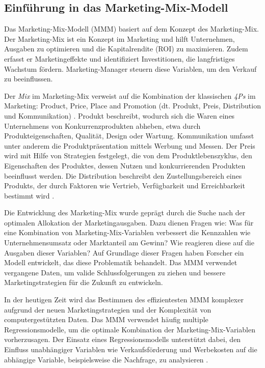 \subsection{Einführung in das Marketing-Mix-Modell}
\label{EinführungInDasMMM}
Das Marketing-Mix-Modell (\ac{MMM}) basiert auf dem Konzept des Marketing-Mix. Der Marketing-Mix ist ein Konzept im Marketing und hilft Unternehmen, Ausgaben zu optimieren und die Kapitalrendite (\ac{ROI}) zu maximieren. Zudem erfasst er Marketingeffekte und identifiziert Investitionen, die langfristiges Wachstum fördern. Marketing-Manager steuern diese Variablen, um den Verkauf zu beeinflussen. \par
Der \textit{Mix} im Marketing-Mix verweist auf die Kombination der klassischen \textit{4Ps} im Marketing: Product, Price, Place and Promotion (dt. Produkt, Preis, Distribution und Kommunikation) \cite[S. 110]{akinkunmi2018data}. Produkt beschreibt, wodurch sich die Waren eines Unternehmens von Konkurrenzprodukten abheben, etwa durch Produkteigenschaften, Qualität, Design oder Wartung. Kommunikation umfasst unter anderem die Produktpräsentation mittels Werbung und Messen. Der Preis wird mit Hilfe von Strategien festgelegt, die von dem Produktlebenszyklus, den Eigenschaften des Produktes, dessen Nutzen und  konkurrierenden Produkten beeinflusst werden. Die Distribution beschreibt den Zustellungsbereich eines Produkts, der durch Faktoren wie Vertrieb, Verfügbarkeit und Erreichbarkeit bestimmt wird \cite[109--110]{akinkunmi2018data}. \par
Die Entwicklung des Marketing-Mix wurde geprägt durch die Suche nach der optimalen Allokation der Marketingausgaben. Dazu dienen Fragen wie: Was für eine Kombination von Marketing-Mix-Variablen verbessert die Kennzahlen wie Unternehmensumsatz oder Marktanteil am Gewinn? Wie reagieren diese auf die Ausgaben dieser Variablen? Auf Grundlage dieser Fragen haben Forscher ein Modell entwickelt, das diese Problematik behandelt. Das \ac{MMM} verwendet vergangene Daten, um valide Schlussfolgerungen zu ziehen und bessere Marketingstrategien für die Zukunft zu entwickeln. \par
In der heutigen Zeit wird das Bestimmen des effizientesten \ac{MMM} komplexer aufgrund der neuen Marketingstrategien und der Komplexität von computergestützten Daten. Das \ac{MMM} verwendet häufig multiple Regressionsmodelle, um die optimale Kombination der Marketing-Mix-Variablen vorherzusagen. Der Einsatz eines Regressionsmodells unterstützt dabei, den Einfluss unabhängiger Variablen wie Verkaufsförderung und Werbekosten auf die abhängige Variable, beispielsweise die Nachfrage, zu analysieren \cite[110]{akinkunmi2018data}. \par
